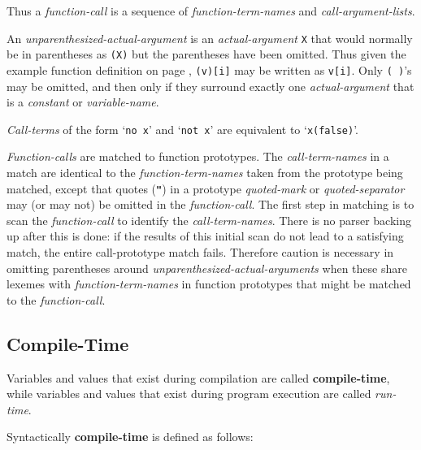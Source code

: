 \documentclass[12pt]{article}
\newcommand{\TT}[1]{{\tt \bfseries #1}}
\newcommand{\key}[1]{{\rm \bfseries #1}}
\begin{document}
Thus a {\em function-call} is a sequence of {\em function-term-names}
and {\em call-argument-lists}.

An {\em unparenthesized-actual-argument} is an {\em actual-argument}
{\tt X} that would normally be in parentheses as {\tt (X)} but the
parentheses have been omitted.  Thus given the example function definition
on page \pageref{REFERENCE-EXPRESSION-FUNCTION-EXAMPLE},
{\tt (v)[i]} may be written as {\tt v[i]}.  Only {\tt (~)}'s may be
omitted, and then only if they surround exactly one {\em actual-argument}
that is a {\em constant} or {\em variable-name}.

{\em Call-terms} of the form `{\tt no x}' and `{\tt not x}' are
equivalent to `{\tt x(false)}'.

{\em Function-calls} are matched to function prototypes.  The
{\em call-term-names} in a match are identical to the
{\em function-term-names} taken from the prototype being matched, except
that quotes (\TT{"}) in a prototype {\em quoted-mark} or
{\em quoted-separator} may (or may not) be omitted in the
{\em function-call}.  The first
step in matching is to scan the {\em function-call} to identify the
{\em call-term-names}.  There is no parser backing up after this is
done: if the results of this initial scan do not lead to a satisfying
match, the entire call-prototype match fails.  Therefore caution
is necessary in omitting parentheses around
{\em unparenthesized-actual-arguments} when these share lexemes with
{\em function-term-names} in function prototypes that might be
matched to the {\em function-call}.

\subsection{Compile-Time}
\label{COMPILE-TIME}

Variables and values that exist during compilation are called
\key{compile-time}, while variables and values that exist during
program execution are called {\em run-time}.

Syntactically \key{compile-time} is defined as follows:
\end{document}
